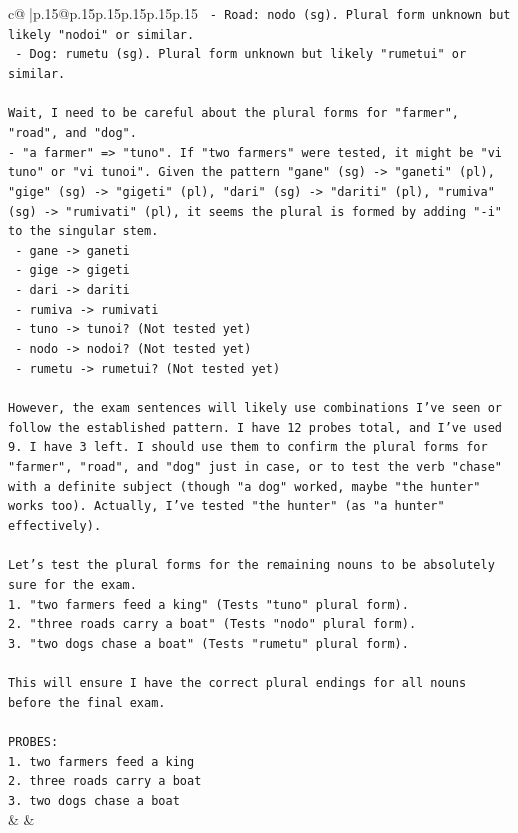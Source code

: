 \documentclass{article}
\begin{document}
{\begin{supertabular}{c@{$\;$}|p{.15\linewidth}@{}p{.15\linewidth}p{.15\linewidth}p{.15\linewidth}p{.15\linewidth}p{.15\linewidth}}
{{{\texttt{  {-} Road: nodo (sg). Plural form unknown but likely "nodoi" or similar.} \\
\texttt{  {-} Dog: rumetu (sg). Plural form unknown but likely "rumetui" or similar.} \\
\\ 
\texttt{Wait, I need to be careful about the plural forms for "farmer", "road", and "dog".} \\
\texttt{{-} "a farmer" => "tuno". If "two farmers" were tested, it might be "vi tuno" or "vi tunoi". Given the pattern "gane" (sg) {-}> "ganeti" (pl), "gige" (sg) {-}> "gigeti" (pl), "dari" (sg) {-}> "dariti" (pl), "rumiva" (sg) {-}> "rumivati" (pl), it seems the plural is formed by adding "{-}i" to the singular stem.} \\
\texttt{  {-} gane {-}> ganeti} \\
\texttt{  {-} gige {-}> gigeti} \\
\texttt{  {-} dari {-}> dariti} \\
\texttt{  {-} rumiva {-}> rumivati} \\
\texttt{  {-} tuno {-}> tunoi? (Not tested yet)} \\
\texttt{  {-} nodo {-}> nodoi? (Not tested yet)} \\
\texttt{  {-} rumetu {-}> rumetui? (Not tested yet)} \\
\\ 
\texttt{However, the exam sentences will likely use combinations I've seen or follow the established pattern. I have 12 probes total, and I've used 9. I have 3 left. I should use them to confirm the plural forms for "farmer", "road", and "dog" just in case, or to test the verb "chase" with a definite subject (though "a dog" worked, maybe "the hunter" works too). Actually, I've tested "the hunter" (as "a hunter" effectively).} \\
\\ 
\texttt{Let's test the plural forms for the remaining nouns to be absolutely sure for the exam.} \\
\texttt{1. "two farmers feed a king" (Tests "tuno" plural form).} \\
\texttt{2. "three roads carry a boat" (Tests "nodo" plural form).} \\
\texttt{3. "two dogs chase a boat" (Tests "rumetu" plural form).} \\
\\ 
\texttt{This will ensure I have the correct plural endings for all nouns before the final exam.} \\
\\ 
\texttt{PROBES:} \\
\texttt{1. two farmers feed a king} \\
\texttt{2. three roads carry a boat} \\
\texttt{3. two dogs chase a boat} \\
            }
        }
    }
    & & \\ \\


\end{supertabular}}
\end{document}
